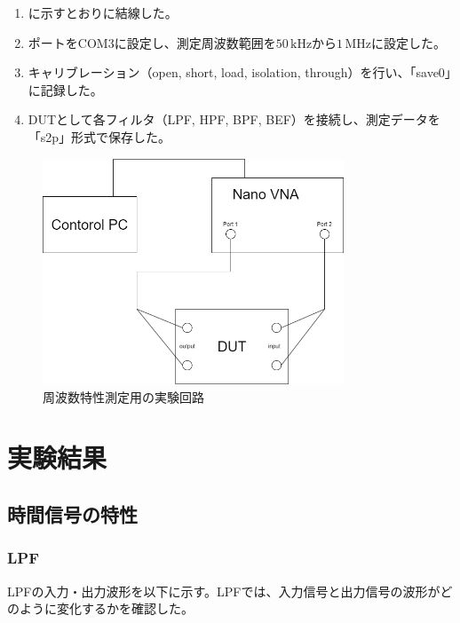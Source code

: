 \documentclass[11pt,dvipdfmx]{jarticle}
\begin{document}
\begin{enumerate}
  \item {}に示すとおりに結線した。
  \item ポートをCOM3に設定し、測定周波数範囲を$50\,\mathrm{kHz}$から$1\,\mathrm{MHz}$に設定した。
  \item キャリブレーション（open, short, load, isolation, through）を行い、「save0」に記録した。
  \item DUTとして各フィルタ（LPF, HPF, BPF, BEF）を接続し、測定データを「s2p」形式で保存した。
\end{enumerate}
\begin{figure}[H]
  \centering
  \includegraphics[width=0.8\textwidth]{fig/VNA.drawio.png}
  \caption{周波数特性測定用の実験回路}
  \label{fig:実験回路2}
\end{figure}

\section{実験結果}
\subsection{時間信号の特性}
\subsubsection{LPF}
LPFの入力・出力波形を以下に示す。LPFでは、入力信号と出力信号の波形がどのように変化するかを確認した。
\end{document}
